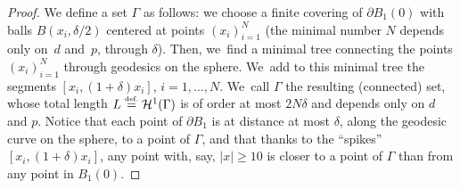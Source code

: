 \documentclass[10pt]{amsart}
\theoremstyle{definition}
\newcommand{\eqdef}{\ensuremath{\stackrel{\mbox{\upshape\tiny def.}}{=}}}
\newcommand\cH{\mathcal{H}}
\begin{document}
\begin{proof}
We define a set $\Gamma$ as follows: we choose a finite covering of
$\partial B_1(0)$ with balls $B(x_i,\delta/2)$ centered
at points $(x_i)_{i=1}^N$ (the minimal number $N$ depends only on~$d$ and~$p$, through $\delta$).
Then, we~find a minimal tree connecting the points $(x_i)_{i=1}^N$ through geodesics on the sphere. We~add to this minimal tree the segments $[x_i,(1+\delta)x_i]$, $i=1,\dots,N$. We~call $\Gamma$ the resulting (connected) set,
whose total length $L\eqdef \cH^1(\Gamma)$ is of order at most $2N\delta$ and depends
only on $d$ and $p$.
Notice that each point of $\partial B_1$ is at distance at most $\delta$,
along the geodesic curve on the sphere, to a point of $\Gamma$, and that thanks to
the ``spikes'' $[x_i,(1+\delta) x_i]$, any point with, say, $|x|\ge 10$ is closer to
a point of $\Gamma$ than from any point in $B_1(0)$.


\end{proof}
\end{document}
